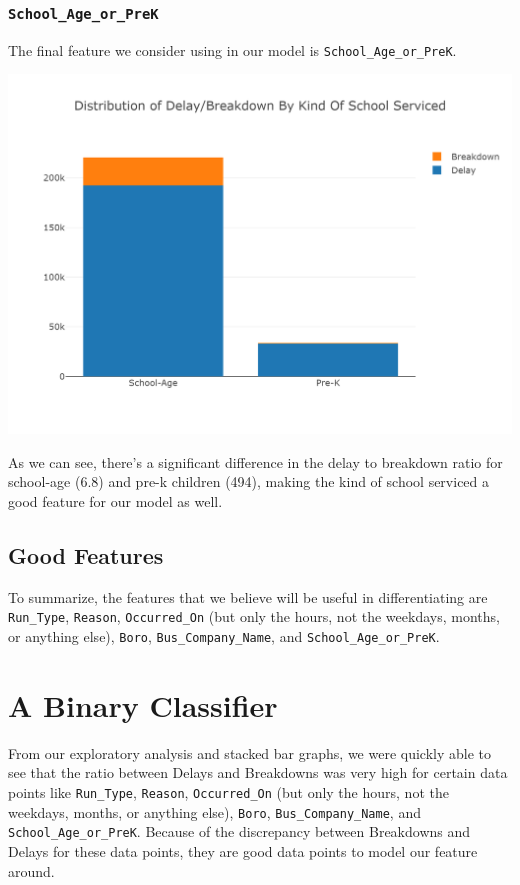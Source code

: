 \documentclass[11pt]{article}
\begin{document}
\subsubsection{\texttt{School\_Age\_or\_PreK}}
The final feature we consider using in our model is \texttt{School\_Age\_or\_PreK}.
\begin{center}
\includegraphics[width=5.25in]{images/school_type_stacked.png}
\end{center}
As we can see, there's a significant difference in the delay to breakdown ratio for school-age (6.8) and pre-k children (494), making the kind of school serviced a good feature for our model as well.

\subsection{Good Features}
To summarize, the features that we believe will be useful in differentiating are \texttt{Run\_Type}, \texttt{Reason}, \texttt{Occurred\_On} (but only the hours, not the weekdays, months, or anything else), \texttt{Boro}, \texttt{Bus\_Company\_Name}, and \texttt{School\_Age\_or\_PreK}.

\newpage
\section{A Binary Classifier}

From our exploratory analysis and stacked bar graphs, we were quickly able to see that the ratio between Delays and Breakdowns was very high for certain data points like \texttt{Run\_Type}, \texttt{Reason}, \texttt{Occurred\_On} (but only the hours, not the weekdays, months, or anything else), \texttt{Boro}, \texttt{Bus\_Company\_Name}, and \texttt{School\_Age\_or\_PreK}. Because of the discrepancy between Breakdowns and Delays for these data points, they are good data points to model our feature around. 
\end{document}
